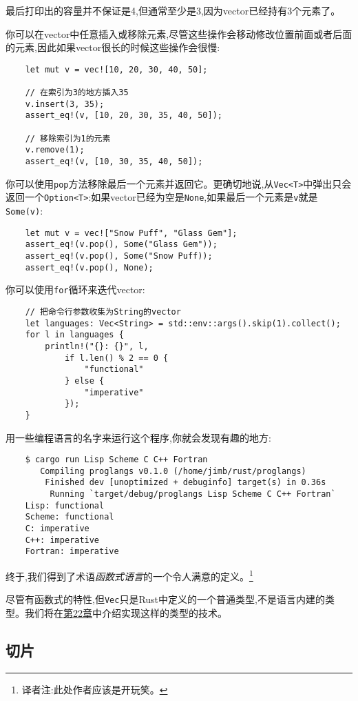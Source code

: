 最后打印出的容量并不保证是4,但通常至少是3,因为vector已经持有3个元素了。

你可以在vector中任意插入或移除元素,尽管这些操作会移动修改位置前面或者后面的元素,因此如果vector很长的时候这些操作会很慢:
\begin{verbatim}
    let mut v = vec![10, 20, 30, 40, 50];

    // 在索引为3的地方插入35
    v.insert(3, 35);
    assert_eq!(v, [10, 20, 30, 35, 40, 50]);

    // 移除索引为1的元素
    v.remove(1);
    assert_eq!(v, [10, 30, 35, 40, 50]);
\end{verbatim}

你可以使用\texttt{pop}方法移除最后一个元素并返回它。更确切地说,从\texttt{Vec<T>}中弹出只会返回一个\texttt{Option<T>}:如果vector已经为空是\texttt{None},如果最后一个元素是\texttt{v}就是\texttt{Some(v)}:
\begin{verbatim}
    let mut v = vec!["Snow Puff", "Glass Gem"];
    assert_eq!(v.pop(), Some("Glass Gem"));
    assert_eq!(v.pop(), Some("Snow Puff));
    assert_eq!(v.pop(), None);
\end{verbatim}

你可以使用\texttt{for}循环来迭代vector:
\begin{verbatim}
    // 把命令行参数收集为String的vector
    let languages: Vec<String> = std::env::args().skip(1).collect();
    for l in languages {
        println!("{}: {}", l,
            if l.len() % 2 == 0 {
                "functional"
            } else {
                "imperative"
            });
    }
\end{verbatim}

用一些编程语言的名字来运行这个程序,你就会发现有趣的地方:
\begin{verbatim}
    $ cargo run Lisp Scheme C C++ Fortran
       Compiling proglangs v0.1.0 (/home/jimb/rust/proglangs)
        Finished dev [unoptimized + debuginfo] target(s) in 0.36s
         Running `target/debug/proglangs Lisp Scheme C C++ Fortran`
    Lisp: functional
    Scheme: functional
    C: imperative
    C++: imperative
    Fortran: imperative
\end{verbatim}

终于,我们得到了术语\emph{函数式语言}的一个令人满意的定义。\footnote{译者注:此处作者应该是开玩笑。}

尽管有函数式的特性,但\texttt{Vec}只是Rust中定义的一个普通类型,不是语言内建的类型。我们将在\hyperref[ch22]{第22章}中介绍实现这样的类型的技术。

\subsection{切片}\label{slice}

